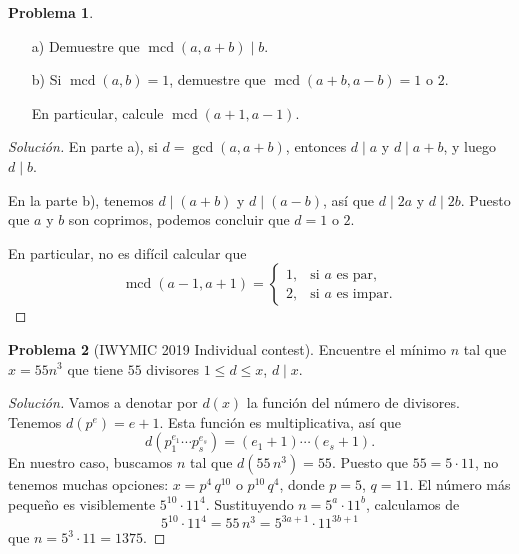 \documentclass{article}
\DeclareMathOperator{\mcd}{mcd}
\theoremstyle{definition}
\newtheorem{problema}{Problema}
\newenvironment{solucion}{\begin{proof}[Solución]\small}{\end{proof}}
\begin{document}
\begin{problema}
  ~

  \begin{enumerate}
  \item[a)] Demuestre que $\mcd(a, a + b) \mid b$.

  \item[b)] Si $\mcd (a,b) = 1$, demuestre que $\mcd (a+b, a-b) = 1$ o $2$.

    En particular, calcule $\mcd (a+1, a-1)$.
  \end{enumerate}

  \ifdefined\solutions\begin{solucion}
    En parte a), si $d = \gcd (a,a+b)$, entonces $d \mid a$ y $d \mid a+b$, y
    luego $d \mid b$.

    \vspace{1em}

    En la parte b), tenemos $d \mid (a+b)$ y $d \mid (a-b)$, así que $d \mid 2a$
    y $d \mid 2b$. Puesto que $a$ y $b$ son coprimos, podemos concluir que
    $d = 1$ o $2$.

    En particular, no es difícil calcular que
    \[ \mcd (a-1,a+1) =
      \begin{cases}
        1, & \text{si }a\text{ es par}, \\
        2, & \text{si }a\text{ es impar}.
      \end{cases} \]
    \end{solucion}\fi
\end{problema}

\begin{problema}[IWYMIC 2019 Individual contest]
  Encuentre el mínimo $n$ tal que $x = 55 n^3$ que tiene $55$ divisores
  $1 \le d \le x$, $d \mid x$.

  \ifdefined\solutions\begin{solucion}
    Vamos a denotar por $d (x)$ la función del número de divisores. Tenemos
    $d (p^e) = e+1$. Esta función es multiplicativa, así que
    $$d (p_1^{e_1}\cdots p_s^{e_s}) = (e_1+1)\cdots (e_s+1).$$
    En nuestro caso, buscamos $n$ tal que $d (55\,n^3) = 55$. Puesto que
    $55 = 5\cdot 11$, no tenemos muchas opciones:
    $x = p^4\,q^{10}$ o $p^{10}\,q^4$, donde $p = 5$, $q = 11$.
    El número más pequeño es visiblemente $5^{10}\cdot 11^4$. Sustituyendo
    $n = 5^a\cdot 11^b$, calculamos de
    $$5^{10}\cdot 11^4 = 55\,n^3 = 5^{3a+1}\cdot 11^{3b+1}$$
    que $n = 5^3\cdot 11 = 1375$.
  \end{solucion}\fi
\end{problema}
\end{document}
